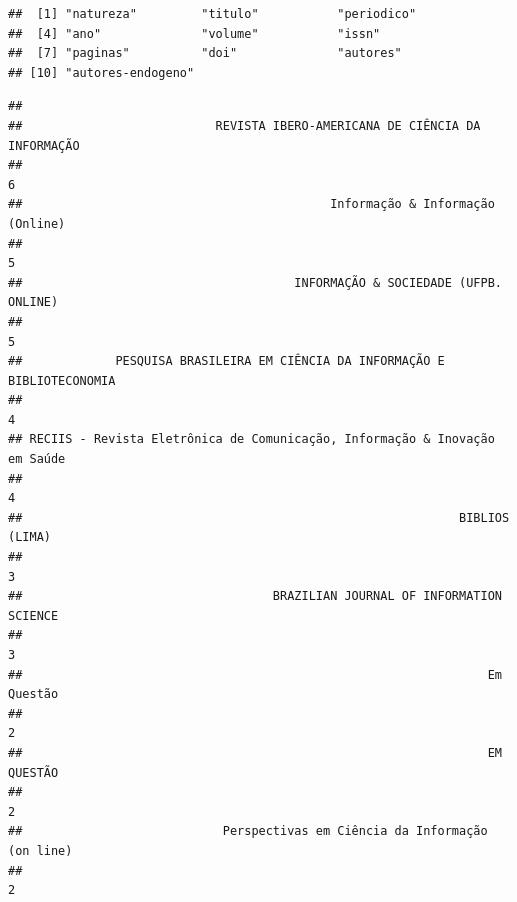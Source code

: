 \documentclass[]{article}
\newenvironment{Shaded}{\begin{snugshade}}{\end{snugshade}}
\newcommand{\KeywordTok}[1]{\textcolor[rgb]{0.13,0.29,0.53}{\textbf{#1}}}
\newcommand{\DataTypeTok}[1]{\textcolor[rgb]{0.13,0.29,0.53}{#1}}
\newcommand{\DecValTok}[1]{\textcolor[rgb]{0.00,0.00,0.81}{#1}}
\newcommand{\StringTok}[1]{\textcolor[rgb]{0.31,0.60,0.02}{#1}}
\newcommand{\OtherTok}[1]{\textcolor[rgb]{0.56,0.35,0.01}{#1}}
\newcommand{\OperatorTok}[1]{\textcolor[rgb]{0.81,0.36,0.00}{\textbf{#1}}}
\newcommand{\NormalTok}[1]{#1}
\begin{document}
\begin{Shaded}
\end{Shaded}

\begin{verbatim}
##  [1] "natureza"         "titulo"           "periodico"       
##  [4] "ano"              "volume"           "issn"            
##  [7] "paginas"          "doi"              "autores"         
## [10] "autores-endogeno"
\end{verbatim}

\begin{Shaded}
\end{Shaded}

\begin{verbatim}
## 
##                           REVISTA IBERO-AMERICANA DE CIÊNCIA DA INFORMAÇÃO 
##                                                                          6 
##                                           Informação & Informação (Online) 
##                                                                          5 
##                                      INFORMAÇÃO & SOCIEDADE (UFPB. ONLINE) 
##                                                                          5 
##             PESQUISA BRASILEIRA EM CIÊNCIA DA INFORMAÇÃO E BIBLIOTECONOMIA 
##                                                                          4 
## RECIIS - Revista Eletrônica de Comunicação, Informação & Inovação em Saúde 
##                                                                          4 
##                                                             BIBLIOS (LIMA) 
##                                                                          3 
##                                   BRAZILIAN JOURNAL OF INFORMATION SCIENCE 
##                                                                          3 
##                                                                 Em Questão 
##                                                                          2 
##                                                                 EM QUESTÃO 
##                                                                          2 
##                            Perspectivas em Ciência da Informação (on line) 
##                                                                          2
\end{verbatim}
\end{document}
